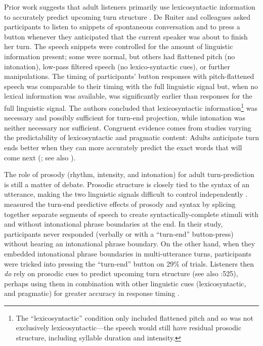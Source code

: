 \documentclass[authoryear, 12pt]{elsarticle}
\begin{document}
Prior work suggests that adult listeners primarily use lexicosyntactic information to accurately predict upcoming turn structure \citep{de-ruiter2006}. De Ruiter and colleagues \citeyearpar{de-ruiter2006} asked participants to listen to snippets of spontaneous conversation and to press a button whenever they anticipated that the current speaker was about to finish her turn. The speech snippets were controlled for the amount of linguistic information present; some were normal, but others had flattened pitch (no intonation), low-pass filtered speech (no lexico-syntactic cues), or further manipulations. The timing of participants' button responses with pitch-flattened speech was comparable to their timing with the full linguistic signal but, when no lexical information was available, was significantly earlier than responses for the full linguistic signal. The authors concluded that lexicosyntactic information\footnote{The ``lexicosyntactic'' condition only included flattened pitch and so was not exclusively lexicosyntactic---the speech would still have residual prosodic structure, including syllable duration and intensity.} was necessary and possibly sufficient for turn-end projection, while intonation was neither necessary nor sufficient. Congruent evidence comes from studies varying the predictability of lexicosyntactic and pragmatic content: Adults anticipate turn ends better when they can more accurately predict the exact words that will come next (\citealp{magyari2012}; see also \citealp{magyariUndRev}).

The role of prosody (rhythm, intensity, and intonation) for adult turn-prediction is still a matter of debate. Prosodic structure is closely tied to the syntax of an utterance, making the two linguistic signals difficult to control independently \citep{ford1996}. \citet*{torreiraUndRev} measured the turn-end predictive effects of prosody and syntax by splicing together separate segments of speech to create syntactically-complete stimuli with and without intonational phrase boundaries at the end. In their study, participants never responded (verbally or with a ``turn-end'' button-press)  without hearing an intonational phrase boundary. On the other hand, when they embedded intonational phrase boundaries in multi-utterance turns, participants were tricked into pressing the ``turn-end'' button on 29\% of trials. Listeners then \textit{do} rely on prosodic cues to predict upcoming turn structure (see also \citet{de-ruiter2006}:525), perhaps using them in combination with other linguistic cues (lexicosyntactic, and pragmatic) for greater accuracy in response timing \citep{duncan1972, ford1996, levinson2013, hirvenkari2013}.
\end{document}
